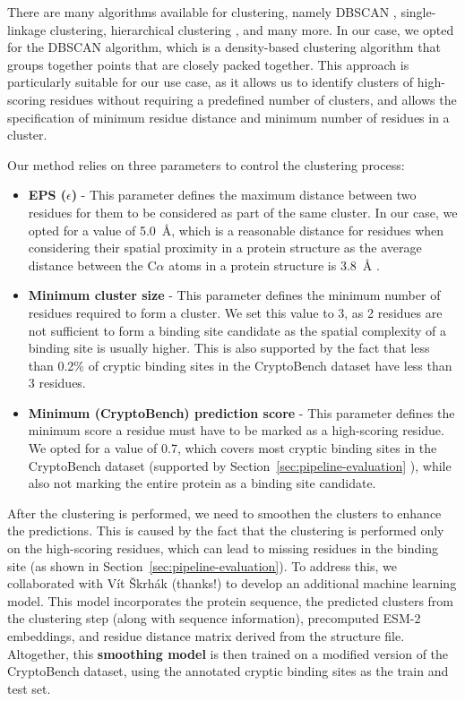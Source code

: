 There are many algorithms available for clustering, namely DBSCAN \cite{schubert2017dbscan}, single-linkage clustering, hierarchical clustering \cite{jarman2020hierarchical}, and many more. In our case, we opted for the DBSCAN algorithm, which is a density-based clustering algorithm that groups together points that are closely packed together. This approach is particularly suitable for our use case, as it allows us to identify clusters of high-scoring residues without requiring a predefined number of clusters, and allows the specification of minimum residue distance and minimum number of residues in a cluster.

Our method relies on three parameters to control the clustering process:
\begin{itemize}
    \item \textbf{EPS ($\epsilon$)} - This parameter defines the maximum distance between two residues for them to be considered as part of the same cluster. In our case, we opted for a value of 5.0~\AA, which is a reasonable distance for residues when considering their spatial proximity in a protein structure as the average distance between the C$\alpha$ atoms in a protein structure is 3.8~\AA{} \cite{creighton1993proteins}.
    \item \textbf{Minimum cluster size} - This parameter defines the minimum number of residues required to form a cluster. We set this value to 3, as 2 residues are not sufficient to form a binding site candidate as the spatial complexity of a binding site is usually higher. This is also supported by the fact that less than 0.2\% of cryptic binding sites in the CryptoBench dataset have less than 3 residues.
    \item \textbf{Minimum (CryptoBench) prediction score} - This parameter defines the minimum score a residue must have to be marked as a high-scoring residue. We opted for a value of 0.7, which covers most cryptic binding sites in the CryptoBench dataset (supported by Section~\ref{sec:pipeline-evaluation} ), while also not marking the entire protein as a binding site candidate.
\end{itemize}

After the clustering is performed, we need to smoothen the clusters to enhance the predictions. This is caused by the fact that the clustering is performed only on the high-scoring residues, which can lead to missing residues in the binding site (as shown in Section~\ref{sec:pipeline-evaluation}). To address this, we collaborated with Vít Škrhák (thanks!) to develop an additional machine learning model. This model incorporates the protein sequence, the predicted clusters from the clustering step (along with sequence information), precomputed ESM-2 embeddings, and residue distance matrix derived from the structure file. Altogether, this \textbf{smoothing model} is then trained on a modified version of the CryptoBench dataset, using the annotated cryptic binding sites as the train and test set.

